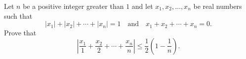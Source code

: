 Let $n$ be a positive integer greater than $1$ and let $x_1,x_2,\ldots,x_n$ be real numbers such that \[|x_1|+|x_2|+\cdots+|x_n|=1\quad\text{and}\quad x_1+x_2+\cdots+x_n=0.\] Prove that \[\left|\frac{x_1}{1}+\frac{x_2}{2}+\cdots+\frac{x_n}{n}\right|\leq\frac{1}{2}\left(1-\frac{1}{n}\right).\]